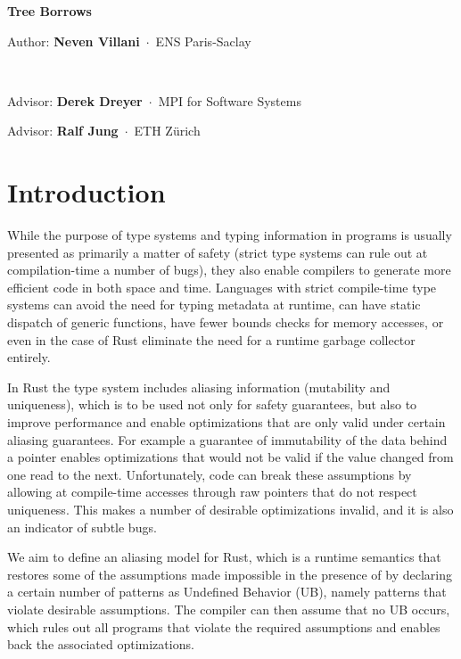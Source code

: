 \documentclass[a4paper,11pt]{article}
\newcommand{\myaff}[1]{\,$\cdot$\, {\small #1}\par\smallskip}
\newcommand{\fakeparagraph}[2]{\par\noindent\textbf{#1}\hspace{1em}#2}
\theoremstyle{plain}
\theoremstyle{definition}
\theoremstyle{remark}
\newcommand{\tcode}[1]{\rstinline{#1}}
\newenvironment{myabstract}
{\list{}{\listparindent 1.5em%
        \itemindent    \listparindent
        \leftmargin    0cm
        \rightmargin   0cm
        \parsep        0pt}%
    \item\relax}
{\endlist}
\newenvironment{mycover}
{\list{}{\listparindent 0pt
        \itemindent    \listparindent
        \leftmargin    0cm
        \rightmargin   0cm
        \parsep        0pt}%
    \raggedright
    \item\relax}
{\endlist}
\begin{document}
\begin{mycover}
{\huge\bfseries\boldmath Tree Borrows\par}
\bigskip
\bigskip
\bigskip


Author: \textbf{Neven Villani}
\myaff{ENS Paris-Saclay}

~\newline

Advisor: \textbf{Derek Dreyer}
\myaff{MPI for Software Systems}


Advisor: \textbf{Ralf Jung}
\myaff{ETH Zürich}


\end{mycover}
\medskip


\section{Introduction}

While the purpose of type systems and typing information in programs is usually
presented as primarily a matter of safety (strict type systems can rule out
at compilation-time a number of bugs), they also enable compilers to generate
more efficient code in both space and time. Languages with strict compile-time
type systems can avoid the need for typing metadata at runtime, can have static
dispatch of generic functions, have fewer bounds checks for memory accesses,
or even in the case of Rust eliminate the need for a runtime garbage collector entirely.

In Rust the type system includes aliasing information (mutability and uniqueness),
which is to be used not only for safety guarantees, but also to improve
performance and enable optimizations that are only valid under certain aliasing
guarantees. For example a guarantee of immutability of the data behind a pointer
enables optimizations that would not be valid if the value changed from one read
to the next.
Unfortunately, \tcode{unsafe} code can break these assumptions by allowing at
compile-time accesses through raw pointers that do not respect uniqueness.
This makes a number of desirable optimizations invalid, and it is also an
indicator of subtle bugs.

We aim to define an aliasing model for Rust, which is a runtime semantics
that restores some of the assumptions made impossible in the presence of \tcode{unsafe}
by declaring a certain number of patterns as Undefined Behavior (UB), namely
patterns that violate desirable assumptions. The compiler can then assume
that no UB occurs, which rules out all programs that violate the required
assumptions and enables back the associated optimizations.
\end{document}

